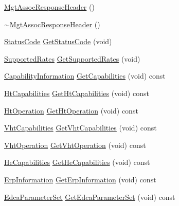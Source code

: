 \begin{DoxyCompactItemize}
\item 
\hyperlink{classns3_1_1MgtAssocResponseHeader_ac534c46909a5873532107f817e39200e}{Mgt\+Assoc\+Response\+Header} ()
\item 
\hyperlink{classns3_1_1MgtAssocResponseHeader_ad6f3f771064744f50ab50e044d965b14}{$\sim$\+Mgt\+Assoc\+Response\+Header} ()
\item 
\hyperlink{classns3_1_1StatusCode}{Status\+Code} \hyperlink{classns3_1_1MgtAssocResponseHeader_ab7d500966a53284af0fc2ecf06375c31}{Get\+Status\+Code} (void)
\item 
\hyperlink{classns3_1_1SupportedRates}{Supported\+Rates} \hyperlink{classns3_1_1MgtAssocResponseHeader_a77f5d82458a095b60dfdac1058830d9c}{Get\+Supported\+Rates} (void)
\item 
\hyperlink{classns3_1_1CapabilityInformation}{Capability\+Information} \hyperlink{classns3_1_1MgtAssocResponseHeader_ac55809a98c8085502118729b1b42c9ae}{Get\+Capabilities} (void) const 
\item 
\hyperlink{classns3_1_1HtCapabilities}{Ht\+Capabilities} \hyperlink{classns3_1_1MgtAssocResponseHeader_a792f7ced07365f2b3f78240525dc61cb}{Get\+Ht\+Capabilities} (void) const 
\item 
\hyperlink{classns3_1_1HtOperation}{Ht\+Operation} \hyperlink{classns3_1_1MgtAssocResponseHeader_ac5920d7c76897ae6bfd72d5acf832f48}{Get\+Ht\+Operation} (void) const 
\item 
\hyperlink{classns3_1_1VhtCapabilities}{Vht\+Capabilities} \hyperlink{classns3_1_1MgtAssocResponseHeader_a7b144e04141c2c56d08b6aa45695f2aa}{Get\+Vht\+Capabilities} (void) const 
\item 
\hyperlink{classns3_1_1VhtOperation}{Vht\+Operation} \hyperlink{classns3_1_1MgtAssocResponseHeader_ae1dad1223b4b8fcc01bfa3a8b26a7dd7}{Get\+Vht\+Operation} (void) const 
\item 
\hyperlink{classns3_1_1HeCapabilities}{He\+Capabilities} \hyperlink{classns3_1_1MgtAssocResponseHeader_a4503411f6b147635cc35766243cfd2f4}{Get\+He\+Capabilities} (void) const 
\item 
\hyperlink{classns3_1_1ErpInformation}{Erp\+Information} \hyperlink{classns3_1_1MgtAssocResponseHeader_abf5d0ac81d6ed6c6cb311640e678c6c2}{Get\+Erp\+Information} (void) const 
\item 
\hyperlink{classns3_1_1EdcaParameterSet}{Edca\+Parameter\+Set} \hyperlink{classns3_1_1MgtAssocResponseHeader_a33778d7cf1eff67dbe5c51d3bd36853c}{Get\+Edca\+Parameter\+Set} (void) const 
\item 

\end{DoxyCompactItemize}
